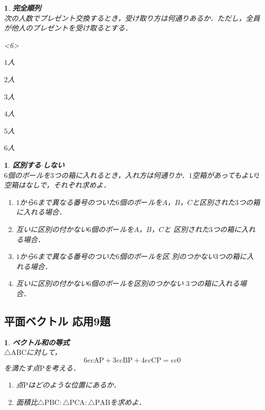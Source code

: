 \documentclass[10pt,
fleqn,
dvipdfmx,
uplatex
]{jsarticle}
\newtheorem{question}[Question]{}
\begin{document}
\begin{question}{\bf\boldmath 完全順列}\\
次の人数でプレゼント交換するとき，受け取り方は何通りあるか．ただし，全員が他人のプレゼントを受け取るとする．
\begin{edaenumerate}<6>
\item $1$人
\item $2$人
\item $3$人
\item $4$人
\item $5$人
\item $6$人
\end{edaenumerate}

\end{question}



\begin{question}{\bf\boldmath 区別する$\cdot$しない}\\
$6$個のボ$ー$ルを$3$つの箱に入れるとき，入れ方は何通りか．$1$空箱があってもよい$2$空箱はなしで，それぞれ求めよ．
\begin{enumerate}
\item $1$から$6$まで異なる番号のついた$6$個のボ$ー$ルを$A$，$B$，$C$と区別された$3$つの箱に入れる場合．
\item 互いに区別の付かない$6$個のボ$ー$ルを$A$，$B$，$C$と
区別された$3$つの箱に入れる場合．
\item $1$から$6$まで異なる番号のついた$6$個のボ$ー$ルを区
別のつかない$3$つの箱に入れる場合．
\item 互いに区別の付かない$6$個のボ$ー$ルを区別のつかない
$3$つの箱に入れる場合．
\end{enumerate}

\end{question}

\subsection{平面ベクトル 応用9題}



\begin{question}{\bf\boldmath ベクトル和の等式}\\
$\triangle \text{ABC}$に対して，
\[6ec{\text{AP}}+3ec{\text{BP}}+4ec{\text{CP}}=ec{0}\]
を満たす点$\text{P}$を考える．
\begin{enumerate}
\item 点$\text{P}$はどのような位置にあるか．
\item 面積比$\triangle \text{PBC}:\triangle \text{PCA}:\triangle \text{PAB}$を求めよ．
\end{enumerate}

\end{question}
\end{document}
